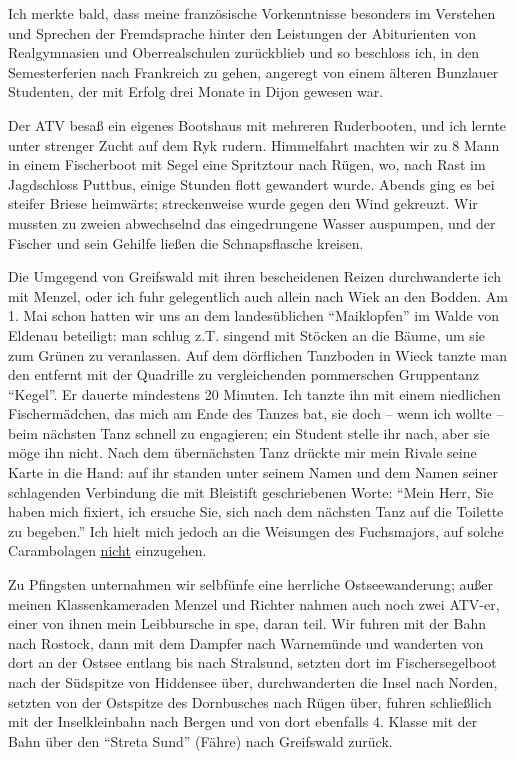 Ich merkte bald, dass meine französische Vorkenntnisse besonders im Verstehen und Sprechen der Fremdsprache hinter den Leistungen der Abiturienten von Realgymnasien und Oberrealschulen zurückblieb und so beschloss ich, in den Semesterferien nach Frankreich zu gehen, angeregt von einem älteren Bunzlauer Studenten, der mit Erfolg drei Monate in Dijon gewesen war.

Der ATV besaß ein eigenes Bootshaus mit mehreren Ruderbooten, und ich lernte unter strenger Zucht auf dem Ryk rudern. Himmelfahrt machten wir zu 8 Mann in einem Fischerboot mit Segel eine Spritztour nach Rügen, wo, nach Rast im Jagdschloss Puttbus, einige Stunden flott gewandert wurde. Abends ging es bei steifer Briese heimwärts; streckenweise wurde gegen den Wind gekreuzt. Wir mussten zu zweien abwechselnd das eingedrungene Wasser auspumpen, und der Fischer und sein Gehilfe ließen die Schnapsflasche kreisen.

Die Umgegend von Greifswald mit ihren bescheidenen Reizen durchwanderte ich mit Menzel, oder ich fuhr gelegentlich auch allein nach Wiek an den Bodden. Am 1. Mai schon hatten wir uns an dem landesüblichen \enquote{Maiklopfen} im Walde von Eldenau beteiligt: man schlug z.T. singend mit Stöcken an die Bäume, um sie zum Grünen zu veranlassen. Auf dem dörflichen Tanzboden in Wieck tanzte man den entfernt mit der Quadrille zu vergleichenden pommerschen Gruppentanz \enquote{Kegel}. Er dauerte mindestens 20 Minuten. Ich tanzte ihn mit einem niedlichen Fischermädchen, das mich am Ende des Tanzes bat, sie doch -- wenn ich wollte -- beim nächsten Tanz schnell zu engagieren; ein Student stelle ihr nach, aber sie möge ihn nicht. Nach dem übernächsten Tanz drückte mir mein Rivale seine Karte in die Hand: auf ihr standen unter seinem Namen und dem Namen seiner schlagenden Verbindung die mit Bleistift geschriebenen Worte: \enquote{Mein Herr, Sie haben mich fixiert, ich ersuche Sie, sich nach dem nächsten Tanz auf die Toilette zu begeben.} Ich hielt mich jedoch an die Weisungen des Fuchsmajors, auf solche Carambolagen \underline{nicht} einzugehen.

Zu Pfingsten unternahmen wir selbfünfe eine herrliche Ostseewanderung; außer meinen Klassenkameraden Menzel und Richter nahmen auch noch zwei ATV-er, einer von ihnen mein Leibbursche in spe, daran teil. Wir fuhren mit der Bahn nach Rostock, dann mit dem Dampfer nach Warnemünde und wanderten von dort an der Ostsee entlang bis nach Stralsund, setzten dort im Fischersegelboot nach der Südspitze von Hiddensee über, durchwanderten die Insel nach Norden, setzten von der Ostspitze des Dornbusches nach Rügen über, fuhren schließlich mit der Inselkleinbahn nach Bergen und von dort ebenfalls 4. Klasse mit der Bahn über den \enquote{Streta Sund} (Fähre) nach Greifswald zurück.\\


